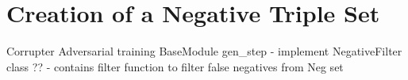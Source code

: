\section{Creation of a Negative Triple Set}
\label{sec:creation_of_a_negative_triple_set}

Corrupter
Adversarial training
BaseModule gen\_step
- implement NegativeFilter class ??
    - contains filter function to filter false negatives from Neg set
    
    
    
    
